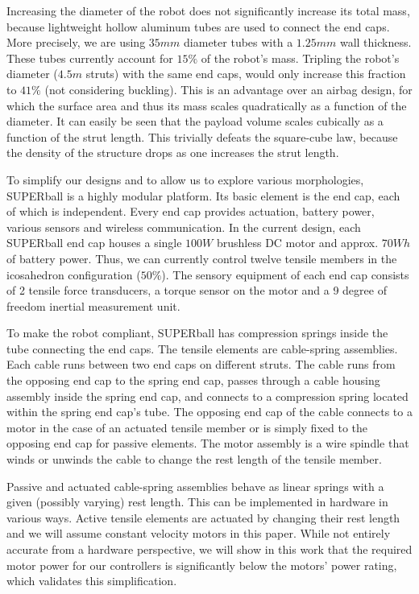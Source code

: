\documentclass[twocolumn,10pt]{asme2ej}
\begin{document}
Increasing the diameter of the robot does not significantly increase its total mass, because lightweight hollow aluminum tubes are used to connect the end caps.
More precisely, we are using $35mm$ diameter tubes with a $1.25mm$ wall thickness. 
These tubes currently account for $15\%$ of the robot's mass. 
Tripling the robot's diameter ($4.5m$ struts) with the same end caps, would only increase this fraction to $41\%$ (not considering buckling).
This is an advantage over an airbag design, for which the surface area and thus its mass scales quadratically as a function of the diameter.
It can easily be seen that the payload volume scales cubically as a function of the strut length.
This trivially defeats the square-cube law, because the density of the structure drops as one increases the strut length. 

To simplify our designs and to allow us to explore various morphologies, SUPERball is a highly modular platform.
Its basic element is the end cap, each of which is independent.
Every end cap provides actuation, battery power, various sensors and wireless communication.
In the current design, each SUPERball end cap houses a single $100W$ brushless DC motor and approx. $70Wh$ of battery power.
Thus, we can currently control twelve tensile members in the icosahedron configuration ($50\%$).
The sensory equipment of each end cap consists of 2 tensile force transducers, a torque sensor on the motor and a 9 degree of freedom inertial measurement unit.

To make the robot compliant, SUPERball has compression springs inside the tube connecting the end caps.
The tensile elements are cable-spring assemblies. 
Each cable runs between two end caps on different struts. The cable runs from the opposing end cap to the spring end cap, passes through a cable housing assembly inside the spring end cap, and connects to a compression spring located within the spring end cap's tube.
The opposing end cap of the cable connects to a motor in the case of an actuated tensile member or is simply fixed to the opposing end cap for passive elements.
The motor assembly is a wire spindle that winds or unwinds the cable to change the rest length of the tensile member.

Passive and actuated cable-spring assemblies behave as linear springs with a given (possibly varying) rest length.
This can be implemented in hardware in various ways. 
Active tensile elements are actuated by changing their rest length and we will assume constant velocity motors in this paper. 
While not entirely accurate from a hardware perspective, 
we will show in this work that the required motor power for our controllers is significantly below the motors' power rating, which validates this simplification.
\end{document}

